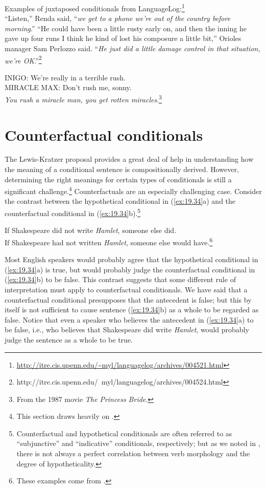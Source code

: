 \ea \label{ex:19.32}
Examples of juxtaposed conditionals from LanguageLog:\footnote{\url{http://itre.cis.upenn.edu/~myl/languagelog/archives/004521.html}} \\
\ea  “Listen,” Renda said, “\textit{we get to a phone we’re out of the country before morning}.”
\ex “He could have been a little rusty early on, and then the inning he gave up four runs I think he kind of lost his composure a little bit,” Orioles manager Sam Perlozzo said. “\textit{He just did a little damage control in that situation, we’re OK}.”\footnote{http://itre.cis.upenn.edu/~myl/languagelog/archives/004524.html}
\z \z

\ea \label{ex:19.33}
INIGO: We’re really in a terrible rush.\\
MIRACLE MAX: Don’t rush me, sonny.\\
  \textit{You rush a miracle man, you get rotten miracles}.\footnote{From the 1987 movie \textit{The Princess Bride}.}
\z

\section{Counterfactual conditionals}\label{sec:19.6}


The Lewis-Kratzer proposal provides a great deal of help in understanding how the meaning of a conditional sentence is compositionally derived. However, determining the right meanings for certain types of conditionals is still a significant challenge.\footnote{This section draws heavily on \citet{vonFintel2012}.} Counterfactuals are an especially challenging case. Consider the contrast between the hypothetical conditional in (\ref{ex:19.34}a) and the counterfactual conditional in (\ref{ex:19.34}b).\footnote{Counterfactual and hypothetical conditionals are often referred to as “subjunctive” and “indicative” conditionals, respectively; but as we noted in , there is not always a perfect correlation between verb morphology and the degree of hypotheticality.}


\ea \label{ex:19.34}
\ea  If Shakespeare did not write \textit{Hamlet}, someone else did.\\
\ex If Shakespeare had not written \textit{Hamlet}, someone else would have.\footnote{These examples come from \citet{Morton2004}.}
                       \z
\z


Most English speakers would probably agree that the hypothetical conditional in (\ref{ex:19.34}a) is true, but would probably judge the counterfactual conditional in (\ref{ex:19.34}b) to be false. This contrast suggests that some different rule of interpretation must apply to counterfactual conditionals. We have said that a counterfactual conditional presupposes that the antecedent is false; but this by itself is not sufficient to cause sentence (\ref{ex:19.34}b) as a whole to be regarded as false. Notice that even a speaker who believes the antecedent in (\ref{ex:19.34}a) to be false, i.e., who believes that Shakespeare did write \textit{Hamlet}, would probably judge the sentence as a whole to be true.


